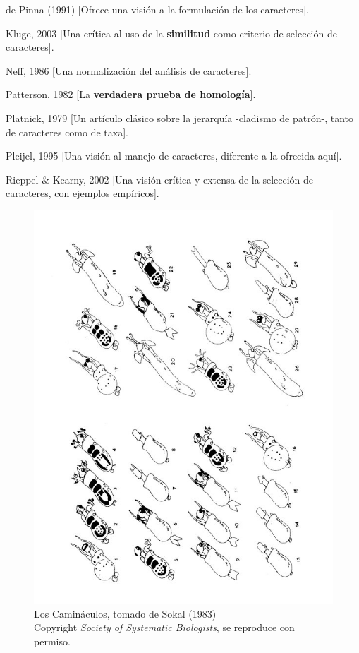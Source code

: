 %
%

de Pinna (1991) [Ofrece una visi\'on a la formulaci\'on de los caracteres].

Kluge, 2003 [Una cr\'itica al uso de la \textbf{similitud} como criterio de selecci\'on de caracteres].

Neff, 1986 [Una normalizaci\'on del an\'alisis de caracteres].

Patterson, 1982 [La \textbf{verdadera prueba de homolog\'ia}].

Platnick, 1979 [Un art\'iculo cl\'asico sobre la jerarqu\'ia -cladismo de patr\'on-, tanto de caracteres como de taxa].

Pleijel, 1995 [Una visi\'on al manejo de caracteres, diferente a la ofrecida aqu\'i].

Rieppel \& Kearny, 2002 [Una visi\'on cr\'itica y extensa de la selecci\'on de caracteres, con ejemplos emp\'iricos].

\begin{figure}
\centering
\includegraphics[scale=0.75]{./practica01/cami0.jpg}
\caption{Los Camin\'aculos, tomado de Sokal (1983) \\Copyright \textit{Society of Systematic Biologists}, se reproduce con permiso.}
\end{figure}

